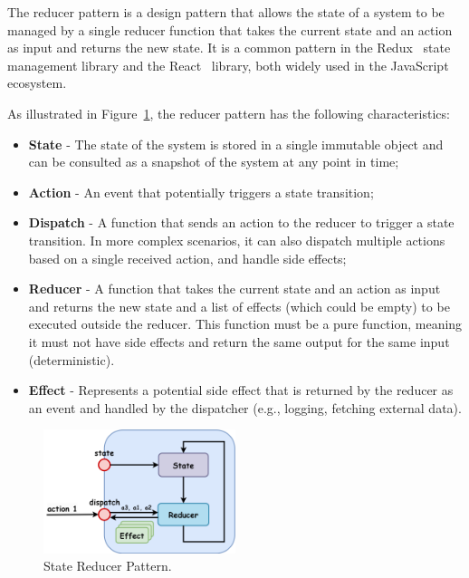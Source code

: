 The reducer pattern is a design pattern
that allows the state of a system
to be managed by a single reducer function
that takes the current state and an action as input and returns the new state.
It is a common pattern in the Redux~\cite{redux} state management library and the React~\cite{react-use-reducer} library,
both widely used in the JavaScript ecosystem.

As illustrated in Figure~\ref{fig:reducer-pattern}, the reducer pattern has the following characteristics:

\begin{itemize}
    \item \textbf{State} - The state of the system is stored in a single immutable object and can be consulted as a snapshot of the system at any point in time;
    \item \textbf{Action} - An event that potentially triggers a state transition;
    \item \textbf{Dispatch} - A function that sends an action to the reducer to trigger a state transition.
    In more complex scenarios, it can also dispatch multiple actions based on a single received action, and handle side effects;
    \item \textbf{Reducer} - A function that takes the current state and an action as input and returns the new state and a list of effects (which could be empty) to be executed outside the reducer.
    This function must be a pure function, meaning it must not have side effects and return the same output for the same input (deterministic).
    \item \textbf{Effect} -
    Represents a potential side effect that is returned by the reducer as an event and handled by the dispatcher (e.g., logging, fetching external data).
\end{itemize}

\begin{figure}[!htb]
    \centering
    \includegraphics[width=0.5\textwidth]{../figures/05_reducer-pattern}
    \caption{State Reducer Pattern.}
    \label{fig:reducer-pattern}
\end{figure}

